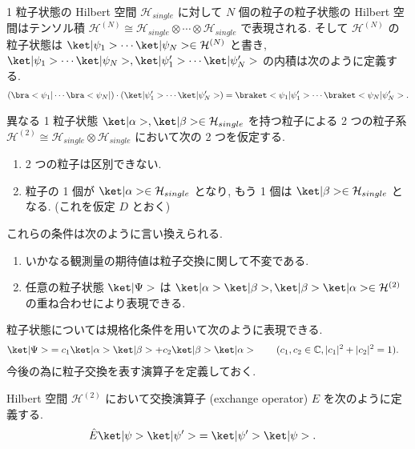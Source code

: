 \documentclass[uplatex,dvipdfmx,a4paper,11pt]{jlreq}
\newcommand{\CC}{\mathbb{C}}
\newcommand{\HH}{\mathcal{H}}
\numberwithin{equation}{section}
\theoremstyle{definition}
\begin{document}
\begin{definition}
  1 粒子状態の Hilbert 空間 $\HH_{single}$ に対して $N$ 個の粒子の粒子状態の Hilbert 空間はテンソル積 $\HH^{(N)}\cong\HH_{single}\otimes\cdots\otimes\HH_{single}$ で表現される.
  そして $\HH^{(N)}$ の粒子状態は $\ket|\psi_1>\cdots\ket|\psi_N> \in\HH^{(N)}$ と書き, $\ket|\psi_1>\cdots\ket|\psi_N>, \ket|\psi_1'>\cdots\ket|\psi_N'>$ の内積は次のように定義する.
  \begin{align}
    (\bra<\psi_1|\cdots\bra<\psi_N|)\cdot(\ket|\psi_1'>\cdots\ket|\psi_N'>) = \braket<\psi_1|\psi_1'>\cdots\braket<\psi_N|\psi_N'>.
  \end{align}
\end{definition}
異なる 1 粒子状態 $\ket|\alpha>,\ket|\beta>\in\HH_{single}$ を持つ粒子による 2 つの粒子系 $\HH^{(2)} \cong \HH_{single}\otimes\HH_{single}$ において次の 2 つを仮定する.

\begin{enumerate}
  \item 2 つの粒子は区別できない.
  \item 粒子の 1 個が $\ket|\alpha>\in\HH_{single}$ となり, もう 1 個は $\ket|\beta>\in\HH_{single}$ となる. (これを仮定 $D$ とおく)
\end{enumerate}
これらの条件は次のように言い換えられる.
\begin{enumerate}
  \item いかなる観測量の期待値は粒子交換に関して不変である.
  \item 任意の粒子状態 $\ket|\Psi>$ は $\ket|\alpha>\ket|\beta>, \ket|\beta>\ket|\alpha>\in\HH^{(2)}$ の重ね合わせにより表現できる.
\end{enumerate}
粒子状態については規格化条件を用いて次のように表現できる.
\begin{align}
  \ket|\Psi> & = c_1\ket|\alpha>\ket|\beta> + c_2\ket|\beta>\ket|\alpha> \qquad (c_1, c_2\in\CC, |c_1|^2 + |c_2|^2 = 1).
\end{align}
今後の為に粒子交換を表す演算子を定義しておく.
\begin{definition}[交換演算子]
  Hilbert 空間 $\HH^{(2)}$ において交換演算子 (exchange operator) $\hat{E}$ を次のように定義する.
  \begin{align}
    \hat{E}\ket|\psi>\ket|\psi'> & = \ket|\psi'>\ket|\psi>.
  \end{align}
\end{definition}
\end{document}
